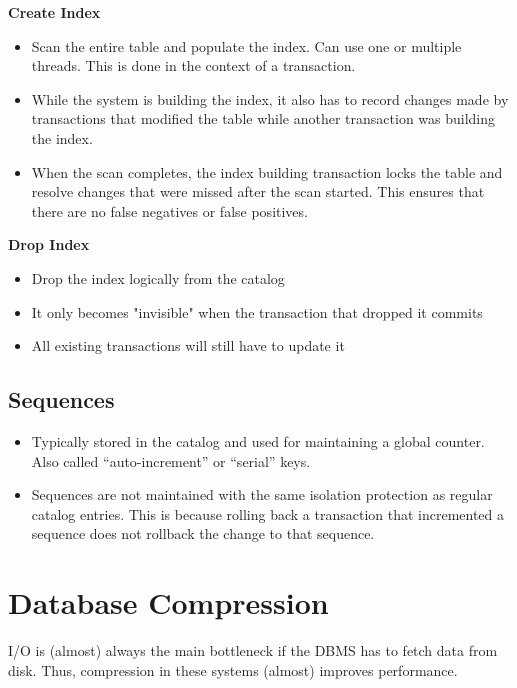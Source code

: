 \documentclass[11pt]{article}
\begin{document}
\textbf{Create Index}
\begin{itemize}
    \item
    Scan the entire table and populate the index.
    Can use one or multiple threads. This is done in the context of a transaction.
    
    \item
    While the system is building the index, it also has to record changes made by transactions that 
    modified the table while another transaction was building the index.
    
    \item
    When the scan completes, the index building transaction locks the table and resolve changes 
that     were missed after the scan started. This ensures that there are no false negatives or 
false     positives.
\end{itemize}

\textbf{Drop Index}
\begin{itemize}
    \item Drop the index logically from the catalog
    \item It only becomes "invisible" when the transaction that dropped it commits
    \item All existing transactions will still have to update it
\end{itemize}

\subsection{Sequences}
\begin{itemize}
    \item
    Typically stored in the catalog and used for maintaining a global counter.
    Also called ``auto-increment'' or ``serial'' keys.
    
    \item
    Sequences are not maintained with the same isolation protection as regular catalog 
    entries. This is because rolling back a transaction that incremented a sequence does not 
    rollback the change to that sequence.
\end{itemize}

\section{Database Compression}
I/O is (almost) always the main bottleneck if the DBMS has to fetch data from disk. Thus, 
compression in these systems (almost) improves performance.
\end{document}
